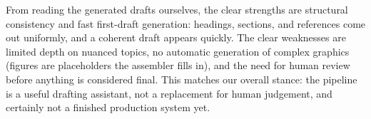 From reading the generated drafts ourselves, the clear strengths are
structural consistency and fast first-draft generation: headings, sections,
and references come out uniformly, and a coherent draft appears quickly. The
clear weaknesses are limited depth on nuanced topics, no automatic generation
of complex graphics (figures are placeholders the assembler fills in), and
the need for human review before anything is considered final. This matches
our overall stance: the pipeline is a useful drafting assistant, not a
replacement for human judgement, and certainly not a finished production
system yet.
